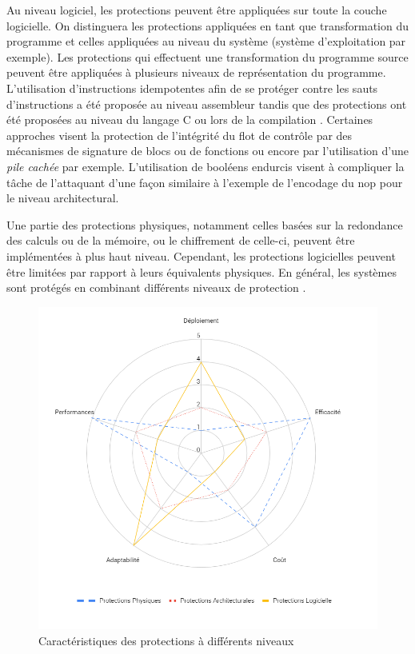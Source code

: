         Au niveau logiciel, les protections peuvent être appliquées sur toute la couche logicielle. On distinguera les protections appliquées en tant que transformation du programme et celles appliquées au niveau du système (système d'exploitation par exemple). 
        Les protections qui effectuent une transformation du programme source peuvent être appliquées à plusieurs niveaux de représentation du programme. 
        L'utilisation d'instructions idempotentes afin de se protéger contre les sauts d'instructions \cite{Moro/Phd14} a été proposée au niveau assembleur tandis que des protections ont été proposées au niveau du langage C \cite{lalande} ou lors de la compilation \cite{Barry/CSCS16, Proy/TACO17}. 
        Certaines approches visent la protection de l'intégrité du flot de contrôle par des mécanismes de signature de blocs ou de fonctions \cite{Oh/TR02, Reis/ISCCO05, Ferriere/LLVM19} ou encore par l'utilisation d'une \textit{pile cachée} \cite{Dureuil/CARDIS15} par exemple.
        L'utilisation de booléens endurcis visent à compliquer la tâche de l'attaquant d'une façon similaire à l'exemple de l'encodage du \gls{nop} pour le niveau architectural.
        
        Une partie des protections physiques, notamment celles basées sur la redondance des calculs ou de la mémoire, ou le chiffrement de celle-ci, peuvent être implémentées à plus haut niveau. Cependant, les protections logicielles peuvent être limitées par rapport à leurs équivalents physiques. En général, les systèmes sont protégés en combinant différents niveaux de protection \cite{Yuce/HASSP16}.
        
        \begin{figure}[htb]\centering
          \includegraphics[scale=.58]{ch2-background/img/ch2-protections-caracs.png}
          \caption{Caractéristiques des protections à différents niveaux}
          \label{fig:ch2-protections}
        \end{figure}
        
